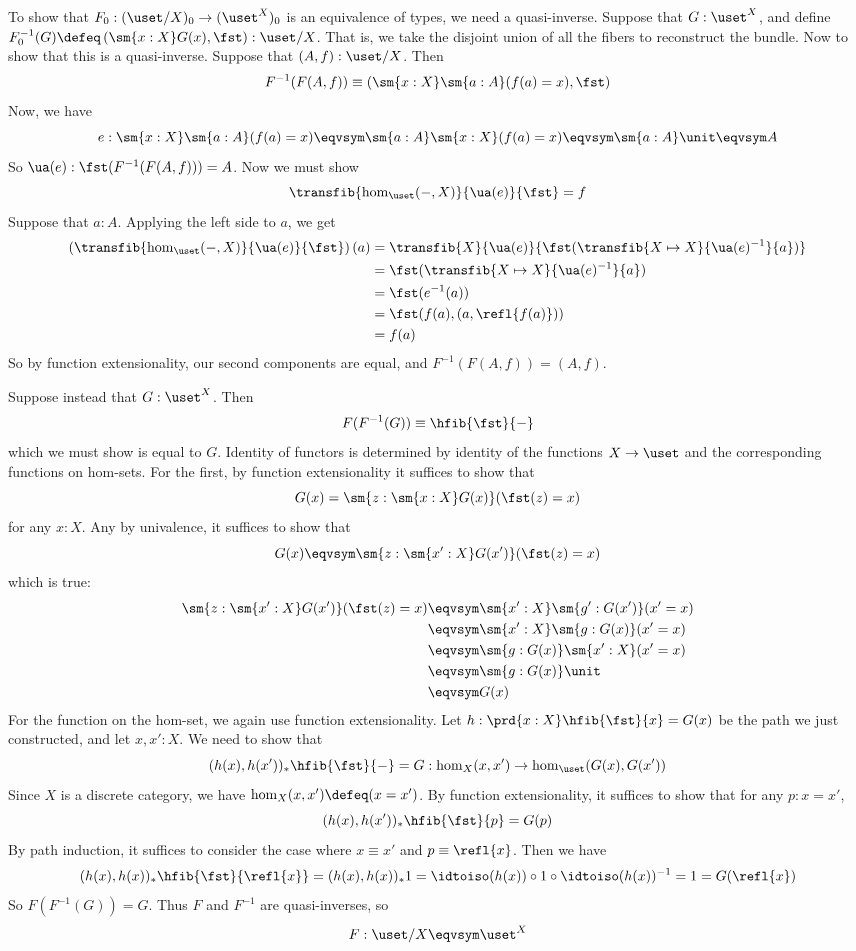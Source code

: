 To show that $F_{0} : (\uset/X)_{0} \to (\uset^{X})_{0}$ is an equivalence of
types, we need a quasi-inverse.  Suppose that $G : \uset^{X}$, and define
$F^{-1}_{0}(G) \defeq \left(\sm{x:X}G(x), \fst\right) : \uset/X$.  That is, we
take the disjoint union of all the fibers to reconstruct the bundle.  Now to
show that this is a quasi-inverse.  Suppose that $(A, f) : \uset/X$.  Then
\[
  F^{-1}(F(A, f)) 
  \equiv \left(\sm{x:X}\sm{a:A}(f(a) = x), \fst\right)
\]
Now, we have
\[
  e : 
  \sm{x:X} \sm{a:A} (f(a) = x)
  \eqvsym
  \sm{a:A} \sm{x:X} (f(a) = x)
  \eqvsym
  \sm{a:A} \unit
  \eqvsym
  A
\]
So $\ua(e) : \fst(F^{-1}(F(A, f))) = A$.  Now we must show
\[
  \transfib{\hom_{\uset}(-, X)}{\ua(e)}{\fst} = f
\]                      
Suppose that $a:A$.  Applying the left side to $a$, we get
\begin{align*}
  \left(\transfib{\hom_{\uset}(-,X)}{\ua(e)}{\fst}\right)(a)
  &=
  \transfib{X}{\ua(e)}{\fst(\transfib{X \mapsto X}{\ua(e)^{-1}}{a})}
  \\&=
  \fst(\transfib{X \mapsto X}{\ua(e)^{-1}}{a})
  \\&=
  \fst(e^{-1}(a))
  \\&=
  \fst(f(a), (a, \refl{f(a)}))
  \\&=
  f(a)
\end{align*}
So by function extensionality, our second components are equal, and
$F^{-1}(F(A, f)) = (A, f)$.


Suppose instead that $G : \uset^{X}$.  Then
\[
  F(F^{-1}(G)) \equiv \hfib{\fst}{-}
\]
which we must show is equal to $G$.  Identity of functors is determined by
identity of the functions $X \to \uset$ and the corresponding functions on
hom-sets.  For the first, by function extensionality it suffices to show that
\[
  G(x)
  =
  \sm{z : \sm{x:X}G(x)}(\fst(z) = x)
\]
for any $x : X$.  Any by univalence, it suffices to show that 
\[
  G(x)
  \eqvsym
  \sm{z : \sm{x':X}G(x')}(\fst(z) = x)
\]
which is true:
\begin{align*}
  \sm{z : \sm{x':X}G(x')}(\fst(z) = x)
  &\eqvsym \sm{x':X}\sm{g':G(x')}(x'=x)
  \\&\eqvsym \sm{x':X}\sm{g:G(x)}(x'=x)
  \\&\eqvsym \sm{g:G(x)}\sm{x':X}(x'=x)
  \\&\eqvsym \sm{g:G(x)}\unit
  \\&\eqvsym G(x)
\end{align*}
For the function on the hom-set, we again use function extensionality.  Let $h
: \prd{x:X} \hfib{\fst}{x} = G(x)$ be the path we just constructed, and let
$x, x' : X$.  We need to show that
\[
  (h(x), h(x'))_{*}\hfib{\fst}{-} = G 
  : \hom_{X}(x, x') \to \hom_{\uset}(G(x), G(x'))
\]
Since $X$ is a discrete category, we have $\hom_{X}(x, x') \defeq (x = x')$.
By function extensionality, it suffices to show that for any $p : x = x'$,
\[
  (h(x), h(x'))_{*}\hfib{\fst}{p} = G(p)
\]
By path induction, it suffices to consider the case where $x \equiv x'$ and $p
\equiv \refl{x}$.  Then we have
\[
  (h(x), h(x))_{*}\hfib{\fst}{\refl{x}}
  =
  (h(x), h(x))_{*}1
  = 
  \idtoiso(h(x)) \circ 1 \circ \idtoiso(h(x))^{-1}
  =
  1
  =
  G(\refl{x})
\]
So $F(F^{-1}(G)) = G$.  Thus $F$ and $F^{-1}$ are quasi-inverses, so
\[
  F : \uset/X \eqvsym \uset^{X}
\]


